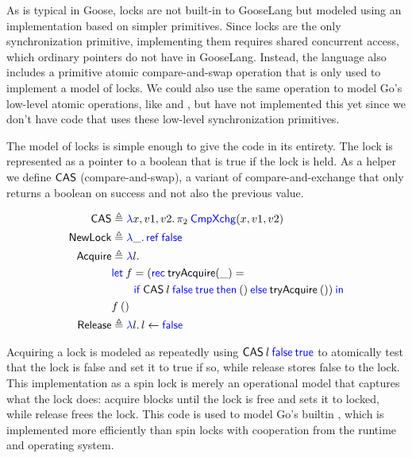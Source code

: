 As is typical in Goose, locks are not built-in to GooseLang but modeled
using an implementation based on simpler primitives. Since locks are the
only synchronization primitive, implementing them requires shared
concurrent access, which ordinary pointers do not have in GooseLang.
Instead, the language also includes a primitive atomic compare-and-swap
operation that is only used to implement a model of locks. We could also
use the same operation to model Go's low-level atomic operations, like
 and , but
have not implemented this yet since we don't have code that uses these
low-level synchronization primitives.

The model of locks is simple enough to give the code in its entirety. The lock
is represented as a pointer to a boolean that is true if the lock is held. As a
helper we define $\mathsf{CAS}$ (compare-and-swap), a variant of compare-and-exchange
that only returns a boolean on success and not also the previous value.

\begin{align*}
  \CAS &\defeq \gooselambda{x, v1, v2} \pi_{2}\app \goosekw{CmpXchg}(x, v1, v2) \\
  \goosedef{NewLock} & \defeq \gooselambda{\_} \goosekw{ref} \app \goosekw{false} \\
  \Acquire &\defeq \gooselambda{l} \\
       &\goosekw{let}\app f = (\goosekw{rec}\: \textlog{tryAcquire}(\_) = \\
       &\qquad \gooseif{\CAS \app l \app \goosekw{false} \app \goosekw{true}}%
         {()}{\textlog{tryAcquire} \app ()}) \app\goosekw{in} \\
       &f \app () \\
  \goosedef{Release} &\defeq \gooselambda{l} l \gets \goosekw{false} \\
\end{align*}

Acquiring a lock is modeled as repeatedly using
$\mathsf{CAS} \: l \: \mathsf{\textcolor{blue}{false}} \: \mathsf{\textcolor{blue}{true}}$ to
atomically test that the lock is false and set it to true if so, while release
stores false to the lock. This implementation as a spin lock is merely an
operational model that captures what the lock does: acquire blocks until the
lock is free and sets it to locked, while release frees the lock. This code is
used to model Go's builtin , which is implemented more
efficiently than spin locks with cooperation from the runtime and operating
system.


